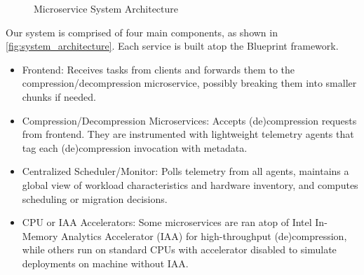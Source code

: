 \begin{figure}[ht]
  \centering
  \caption{Microservice System Architecture}
  \label{fig:system_architecture}
\end{figure}

Our system is comprised of four main components, as shown in \autoref{fig:system_architecture}. Each service is built atop the Blueprint framework.

\begin{itemize}
    \item Frontend: Receives tasks from clients and forwards them to the compression/decompression microservice, possibly breaking them into smaller chunks if needed.
    \item Compression/Decompression Microservices: Accepts (de)compression requests from frontend. They are instrumented with lightweight telemetry agents that tag each (de)compression invocation with metadata.
    \item Centralized Scheduler/Monitor: Polls telemetry from all agents, maintains a global view of workload characteristics and hardware inventory, and computes scheduling or migration decisions.
    \item CPU or IAA Accelerators: Some microservices are ran atop of Intel In-Memory Analytics Accelerator (IAA) for high-throughput (de)compression, while others run on standard CPUs with accelerator disabled to simulate deployments on machine without IAA.
\end{itemize}

